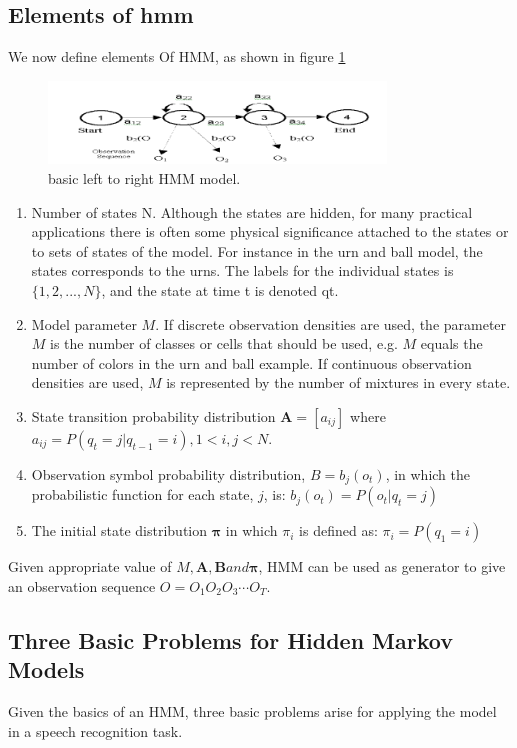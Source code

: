 \documentclass[12pt, a4paper, twoside]{report}
\begin{document}
\subsection{Elements of \acrlong{hmm}}
We now define elements Of HMM, as shown in figure \ref{fig:hmm-elements}
\begin{figure}[!h]
	\centering
	\includegraphics[width=0.8\textwidth]
	{images/chapter4/hmm-elements}
	\caption{basic left to right HMM model.}
	\label{fig:hmm-elements}
\end{figure}

\begin{enumerate}
\item Number of states N. Although the states are hidden, for many practical applications there is often some physical significance attached to the states or to sets of states of the model. For instance in the urn and ball model, the states corresponds to the urns. The labels for the individual states is $\{1, 2, . . . , N\}$, and the state at time t is denoted qt.
\item Model parameter $M$. If discrete observation densities are used, the parameter $M$ is the number of classes or cells that should be used, e.g. $M$ equals the number of colors in the urn and ball example. If continuous observation densities are used, $M$ is represented by the number of mixtures in every state.
\item State transition probability distribution $\mathbf{A} = [a_{ij}]$ where $a_{ij}\! =\! P(q_{t}\! =\! j|q_{t-1}\! =\! i), 1<i,j<N$.
\item Observation symbol probability distribution, $B = {b_j(o_t)}$, in which the probabilistic function for each state, $j$, is: 
$b_j(o_t) = P (o_t|q_t = j)$
\item The initial state distribution $\mathbf{\pi}$ in which $\pi_i$ is defined as: $\pi_i = P(q_1 = i)$
\end{enumerate}
Given appropriate value of $M, \mathbf{A}, \mathbf{B} and \mathbf{\pi}$, HMM can be used as generator to give an observation sequence $O = O_1 O_2 O_3 \cdots O_T$.

\subsection{Three Basic Problems for Hidden Markov Models}
Given the basics of an HMM, three basic problems arise for applying the model in a speech recognition task.
\end{document}

